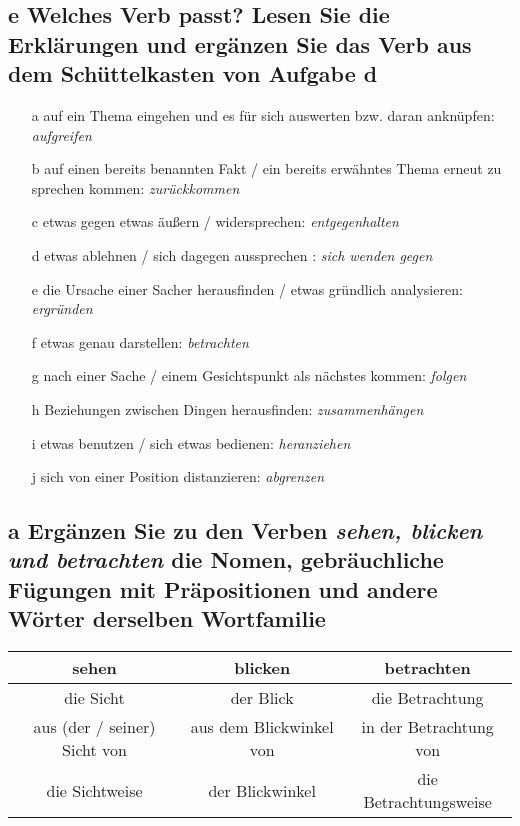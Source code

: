 \documentclass{article}
\begin{document}
	\subsection*{\textbf{e} Welches Verb passt? Lesen Sie die Erklärungen und ergänzen Sie das Verb aus dem Schüttelkasten von Aufgabe d}
	\begin{itemize}
			\item[a]{auf ein Thema eingehen und es für sich auswerten bzw. daran anknüpfen: \textit{aufgreifen}}
			\item[b]{auf einen bereits benannten Fakt / ein bereits erwähntes Thema erneut zu sprechen kommen: \textit{zurückkommen}}
			\item[c]{etwas gegen etwas äußern / widersprechen: \textit{entgegenhalten}}
			\item[d]{etwas ablehnen / sich dagegen aussprechen : \textit{sich wenden gegen}}
			\item[e]{die Ursache einer Sacher herausfinden / etwas gründlich analysieren: \textit{ergründen}}
			\item[f]{etwas genau darstellen: \textit{betrachten}}
			\item[g]{nach einer Sache / einem Gesichtspunkt als nächstes kommen: \textit{folgen}}
			\item[h]{Beziehungen zwischen Dingen herausfinden: \textit{zusammenhängen}}
			\item[i]{etwas benutzen / sich etwas bedienen: \textit{heranziehen}}
			\item[j]{sich von einer Position distanzieren: \textit{abgrenzen}}
	\end{itemize}
	\subsection*{\textbf{a} Ergänzen Sie zu den Verben \textit{sehen, blicken und betrachten} die Nomen, gebräuchliche Fügungen mit Präpositionen und andere Wörter derselben Wortfamilie}
	\begin{tabular}{| c | c | c |}
		\toprule
		\textbf{sehen} & \textbf{blicken} & \textbf{betrachten}\\ \midrule
		die Sicht & der Blick & die Betrachtung \\
		aus (der / seiner) Sicht von & aus dem Blickwinkel von & in der Betrachtung von \\
		die Sichtweise & der Blickwinkel & die Betrachtungsweise \\
		\bottomrule
	\end{tabular}
\end{document}
